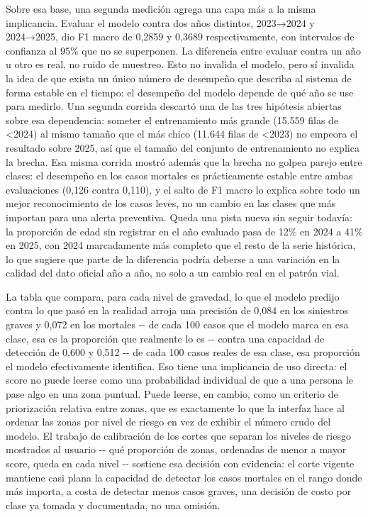 Sobre esa base, una segunda medición agrega una capa más a la misma
implicancia. Evaluar el modelo contra dos años distintos, 2023→2024 y
2024→2025, dio F1 macro de 0,2859 y 0,3689 respectivamente, con
intervalos de confianza al 95\% que no se superponen. La diferencia
entre evaluar contra un año u otro es real, no ruido de muestreo. Esto
no invalida el modelo, pero sí invalida la idea de que exista un único
número de desempeño que describa al sistema de forma estable en el
tiempo: el desempeño del modelo depende de qué año se use para medirlo.
Una segunda corrida descartó una de las tres hipótesis abiertas sobre
esa dependencia: someter el entrenamiento más grande (15.559 filas de
\textless2024) al mismo tamaño que el más chico (11.644 filas de
\textless2023) no empeora el resultado sobre 2025, así que el tamaño del
conjunto de entrenamiento no explica la brecha. Esa misma corrida mostró
además que la brecha no golpea parejo entre clases: el desempeño en los
casos mortales es prácticamente estable entre ambas evaluaciones (0,126
contra 0,110), y el salto de F1 macro lo explica sobre todo un mejor
reconocimiento de los casos leves, no un cambio en las clases que más
importan para una alerta preventiva. Queda una pista nueva sin seguir
todavía: la proporción de edad sin registrar en el año evaluado pasa de
12\% en 2024 a 41\% en 2025, con 2024 marcadamente más completo que el
resto de la serie histórica, lo que sugiere que parte de la diferencia
podría deberse a una variación en la calidad del dato oficial año a año,
no solo a un cambio real en el patrón vial.

La tabla que compara, para cada nivel de gravedad, lo que el modelo
predijo contra lo que pasó en la realidad arroja una precisión de 0,084
en los siniestros graves y 0,072 en los mortales -\/- de cada 100 casos
que el modelo marca en esa clase, esa es la proporción que realmente lo
es -\/- contra una capacidad de detección de 0,600 y 0,512 -\/- de cada
100 casos reales de esa clase, esa proporción el modelo efectivamente
identifica. Eso tiene una implicancia de uso directa: el score no puede
leerse como una probabilidad individual de que a una persona le pase
algo en una zona puntual. Puede leerse, en cambio, como un criterio de
priorización relativa entre zonas, que es exactamente lo que la interfaz
hace al ordenar las zonas por nivel de riesgo en vez de exhibir el
número crudo del modelo. El trabajo de calibración de los cortes que
separan los niveles de riesgo mostrados al usuario -\/- qué proporción
de zonas, ordenadas de menor a mayor score, queda en cada nivel -\/-
sostiene esa decisión con evidencia: el corte vigente mantiene casi
plana la capacidad de detectar los casos mortales en el rango donde más
importa, a costa de detectar menos casos graves, una decisión de costo
por clase ya tomada y documentada, no una omisión.

